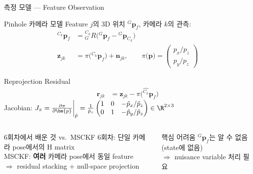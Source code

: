 \begin{frame}[shrink=10]{측정 모델 — Feature Observation}
  \begin{block}{Pinhole 카메라 모델}
    Feature $j$의 3D 위치 ${}^G\bm{p}_f$, 카메라 $k$의 관측:
    \begin{align*}
      {}^{C_k}\bm{p}_f &= {}^{C_k}_G R\bigl({}^G\bm{p}_f - {}^G\bm{p}_{C_k}\bigr) \\
      \bm{z}_{jk} &= \pi\bigl({}^{C_k}\bm{p}_f\bigr) + \bm{n}_{jk}, \qquad
      \pi\bigl(\bm{p}\bigr) = \begin{pmatrix}p_x/p_z \\ p_y/p_z\end{pmatrix}
    \end{align*}
  \end{block}
  \begin{block}{Reprojection Residual}
    \begin{align*}
      \bm{r}_{jk} &= \bm{z}_{jk} - \pi\!\bigl(\hat{{}^{C_k}}\bm{p}_f\bigr)
    \end{align*}
    Jacobian: $J_\pi = \frac{\partial \pi}{\partial \bm{p}}\bigg|_{\hat{p}}
    = \frac{1}{\hat{p}_z}\begin{pmatrix}1 & 0 & -\hat{p}_x/\hat{p}_z \\ 0 & 1 & -\hat{p}_y/\hat{p}_z\end{pmatrix}
    \in \R^{2\times 3}$
  \end{block}
  \begin{columns}[T]
      \begin{exampleblock}{6회차에서 배운 것 vs.\ MSCKF}
        6회차: 단일 카메라 pose에서의 H matrix\\
        MSCKF: \textbf{여러} 카메라 pose에서 동일 feature\\
        $\Rightarrow$ residual stacking + null-space projection
      \end{exampleblock}
      \begin{alertblock}{핵심 어려움}
        ${}^G\bm{p}_f$는 알 수 없음 (state에 없음)\\
        $\Rightarrow$ nuisance variable 처리 필요
      \end{alertblock}
  \end{columns}
\end{frame}

